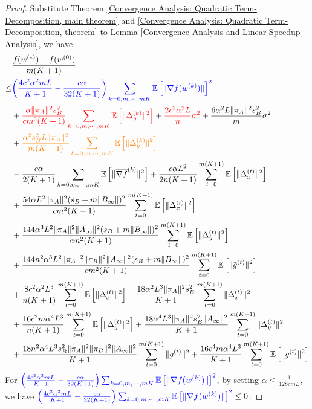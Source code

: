 \documentclass{article}
\newcommand{\EE}[1]{\mathbb{E}\left[#1\right]}
\newcommand{\norm}[1]{\| #1 \|}
\begin{document}
\begin{proof}
  Substitute Theorem \ref{Convergence Analysis: Quadratic Term-Decomposition, main theorem} and \ref{Convergence Analysis: Quadratic Term-Decomposition, theorem} to Lemma \ref{Convergence Analysis and Linear Speedup-Analysis}, we have
  \begin{align*}
    &\frac{f(w^{(*)})-f(w^{(0)})}{m(K+1)}
  \\\leq& \textcolor{blue}{\left(\frac{4c^2\alpha^2mL}{K+1}-\frac{c\alpha}{32(K+1)}\right)\sum_{k=0,m,\cdots,mK}\EE{\norm{\nabla f(w^{(k)})}}^2}\\&+\textcolor{red}{\frac{\alpha\norm{\pi_A}^2s_B^2}{cm^2(K+1)}\sum_{k=0,m,\cdots,mK}\EE{\norm{\Delta_y^{(k)}}^2}}+\textcolor{red}{ \frac{2c^2\alpha^2L}{n}\sigma^2}+\frac{6\alpha^2L\norm{\pi_A}^2s_B^2}{m}\sigma^2\\&+\textcolor{orange}{\frac{\alpha^2s_B^2L\norm{\pi_A}^2}{m(K+1)}\sum_{k=0,m,\cdots,mK}\EE{\norm{\Delta_y^{(k)}}^2}}\\&-\frac{c\alpha }{2(K+1)}\sum_{k=0,m,\cdots,mK}\EE{\norm{\overline{\nabla f}^{(k)}}^2}+\frac{c\alpha L^2}{2n(K+1)}\sum_{t=0}^{m(K+1)}\EE{\norm{\Delta_x^{(t)}}^2}\\&+\frac{54\alpha L^2\norm{\pi_A}^2(s_B+m\norm{B_{\infty}})^2}{cm^2(K+1)}\sum_{t=0}^{m(K+1)}\EE{\norm{\Delta_x^{(t)}}^2}\\&+\frac{144\alpha^3L^2\norm{\pi_A}^2\norm{A_{\infty}}^2(s_B+m\norm{B_{\infty}})^2}{cm^2(K+1)}\sum_{t=0}^{m(K+1)}\EE{\norm{\Delta_y^{(t)}}^2}
    \\&+\frac{144n^2\alpha^3L^2\norm{\pi_A}^2\norm{\pi_B}^2\norm{A_{\infty}}^2(s_B+m\norm{B_{\infty}})^2}{cm^2(K+1)}\sum_{t=0}^{m(K+1)}\EE{\norm{\bar{g}^{(t)}}^2}\\&+\frac{8c^2\alpha^2L^3}{n(K+1)}\sum_{t=0}^{m(K+1)}\EE{\norm{\Delta_x^{(t)}}^2}+\frac{18\alpha^2L^3\norm{\pi_A}^2s_B^2}{ K+1}\sum_{t=0}^{m(K+1)}\norm{\Delta_x^{(t)}}^2\\&+\frac{16c^2m\alpha^4L^3}{n(K+1)}\sum_{t=0}^{m(K+1)}\EE{\norm{\Delta_y^{(t)}}^2}+\frac{18\alpha^4L^3\norm{\pi_A}^2s_B^2\norm{A_{\infty}}^2}{ K+1}\sum_{t=0}^{m(K+1)}\norm{\Delta_y^{(t)}}^2
    \\&+\frac{18n^2\alpha^4L^3s_B^2\norm{\pi_A}^2\norm{\pi_B}^2\norm{A_{\infty}}^2}{ K+1}\sum_{t=0}^{m(K+1)}\norm{\bar{g}^{(t)}}^2+\frac{16c^4m\alpha^4L^3}{K+1}\sum_{t=0}^{m(K+1)}\EE{\norm{\bar{g}^{(t)}}^2}
  \end{align*}
  For $\textcolor{blue}{\left(\frac{4c^2\alpha^2mL}{K+1}-\frac{c\alpha}{32(K+1)}\right)\sum_{k=0,m,\cdots,mK}\EE{\norm{\nabla f(w^{(k)})}}^2}$, by setting $\alpha \leq \frac{1}{128cmL}$, we have $\textcolor{blue}{\left(\frac{4c^2\alpha^2mL}{K+1}-\frac{c\alpha}{32(K+1)}\right)\sum_{k=0,m,\cdots,mK}\EE{\norm{\nabla f(w^{(k)})}}^2}\leq 0$.


\end{proof}
\end{document}
